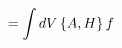 \documentclass[preview]{standalone}
\begin{document}
\begin{align*}
\special{dvisvgm:raw <g id='unique000'>}=\int dV\,\pb{A}{H}\,f\special{dvisvgm:raw </g>}
\end{align*}
\end{document}
